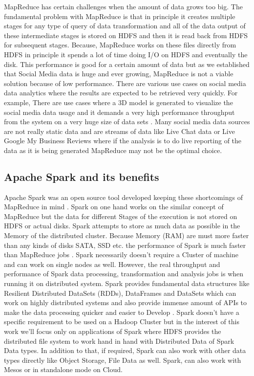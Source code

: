 \documentclass[sigconf]{acmart}
\begin{document}
MapReduce has certain challenges when the amount of data grows too big. The fundamental problem with MapReduce is that in principle it creates multiple stages for any type of query of data transformation and all of the data output of these intermediate stages is stored on HDFS and then it is read back from HDFS for subsequent stages. Because, MapReduce works on these files directly from HDFS in principle it spends a lot of time doing I/O on HDFS and eventually the disk. This performance is good for a certain amount of data but as we established that Social Media data is huge and ever growing, MapReduce is not a viable solution because of low performance. There are various use cases on social media data analytics where the results are expected to be retrieved very quickly. For example, There are use cases where a 3D model is generated to visualize the social media data usage  and it demands a very high performance throughput from the system on a very huge size of data sets \cite{3dvisual}. Many social media data sources are not really static data and are streams of data like Live Chat data or Live Google My Business Reviews where if the analysis is to do live reporting of the data as it is being generated MapReduce may not be the optimal choice.
\subsection{Apache Spark and its benefits}
Apache Spark was an open source tool developed keeping these shortcomings of MapReduce in mind \cite{sparkvsmapr}. Spark on one hand works on the similar concept of MapReduce but the data for different Stages of the execution is not stored on HDFS or actual disks. Spark attempts to store as much data as possible in the Memory of the distributed cluster. Because Memory (RAM) are must more faster than any kinds of disks SATA, SSD etc. the performance of Spark is much faster than MapReduce jobs \cite{sparkvsmapr}. Spark necessarily doesn't require a Cluster of machine and can work on single nodes as well. However, the real throughput and performance of Spark data processing, transformation and analysis jobs is when running it on distributed system. Spark provides fundamental data structures like Resilient Distributed DataSets (RDDs), DataFrames and DataSets which can work on highly distributed systems and also provide immense amount of APIs to make the data processing quicker and easier to Develop \cite{sparkrdddfds}. Spark doesn't have a specific requirement to be used on a Hadoop Cluster but in the interest of this work we'll focus only on applications of Spark where HDFS provides the distributed file system to work hand in hand with Distributed Data of Spark Data types. In addition to that, if required, Spark can also work with other data types directly like Object Storage, File Data as well. Spark, can also work with Mesos or in standalone mode on Cloud.
\end{document}

